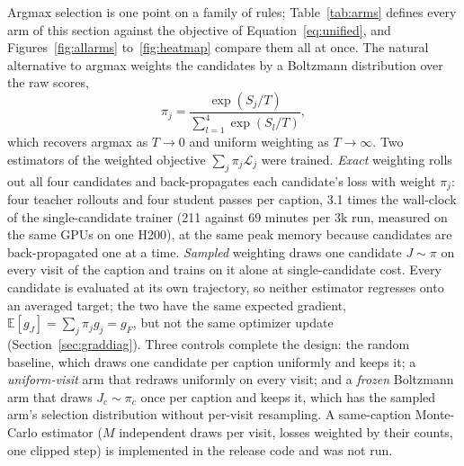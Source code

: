 \documentclass[11pt,a4paper]{article}
\begin{document}
Argmax selection is one point on a family of rules; Table~\ref{tab:arms} defines every arm of this section against the objective of Equation~\ref{eq:unified}, and Figures~\ref{fig:allarms} to~\ref{fig:heatmap} compare them all at once. The natural alternative to argmax weights the candidates by a Boltzmann distribution over the raw scores,
\begin{equation}
\pi_j=\frac{\exp(S_j/T)}{\sum_{l=1}^{4}\exp(S_l/T)},
\end{equation}
which recovers argmax as $T\to0$ and uniform weighting as $T\to\infty$. Two estimators of the weighted objective $\sum_j\pi_j\mathcal{L}_j$ were trained. \emph{Exact} weighting rolls out all four candidates and back-propagates each candidate's loss with weight $\pi_j$: four teacher rollouts and four student passes per caption, 3.1 times the wall-clock of the single-candidate trainer (211 against 69 minutes per 3k run, measured on the same GPUs on one H200), at the same peak memory because candidates are back-propagated one at a time. \emph{Sampled} weighting draws one candidate $J\sim\pi$ on every visit of the caption and trains on it alone at single-candidate cost. Every candidate is evaluated at its own trajectory, so neither estimator regresses onto an averaged target; the two have the same expected gradient, $\mathbb{E}[g_J]=\sum_j\pi_jg_j=g_F$, but not the same optimizer update (Section~\ref{sec:graddiag}). Three controls complete the design: the random baseline, which draws one candidate per caption uniformly and keeps it; a \emph{uniform-visit} arm that redraws uniformly on every visit; and a \emph{frozen} Boltzmann arm that draws $J_c\sim\pi_c$ once per caption and keeps it, which has the sampled arm's selection distribution without per-visit resampling. A same-caption Monte-Carlo estimator ($M$ independent draws per visit, losses weighted by their counts, one clipped step) is implemented in the release code and was not run.
\end{document}
